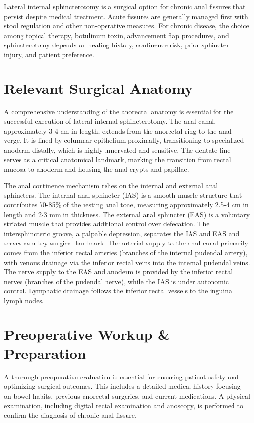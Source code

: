 Lateral internal sphincterotomy is a surgical option for chronic anal fissures that persist despite medical treatment. Acute fissures are generally managed first with stool regulation and other non-operative measures. For chronic disease, the choice among topical therapy, botulinum toxin, advancement flap procedures, and sphincterotomy depends on healing history, continence risk, prior sphincter injury, and patient preference.

\section*{Relevant Surgical Anatomy}
A comprehensive understanding of the anorectal anatomy is essential for the successful execution of lateral internal sphincterotomy. The anal canal, approximately 3-4 cm in length, extends from the anorectal ring to the anal verge. It is lined by columnar epithelium proximally, transitioning to specialized anoderm distally, which is highly innervated and sensitive. The dentate line serves as a critical anatomical landmark, marking the transition from rectal mucosa to anoderm and housing the anal crypts and papillae.

The anal continence mechanism relies on the internal and external anal sphincters. The internal anal sphincter (IAS) is a smooth muscle structure that contributes 70-85\% of the resting anal tone, measuring approximately 2.5-4 cm in length and 2-3 mm in thickness. The external anal sphincter (EAS) is a voluntary striated muscle that provides additional control over defecation. The intersphincteric groove, a palpable depression, separates the IAS and EAS and serves as a key surgical landmark. The arterial supply to the anal canal primarily comes from the inferior rectal arteries (branches of the internal pudendal artery), with venous drainage via the inferior rectal veins into the internal pudendal veins. The nerve supply to the EAS and anoderm is provided by the inferior rectal nerves (branches of the pudendal nerve), while the IAS is under autonomic control. Lymphatic drainage follows the inferior rectal vessels to the inguinal lymph nodes.

\section*{Preoperative Workup \& Preparation}
A thorough preoperative evaluation is essential for ensuring patient safety and optimizing surgical outcomes. This includes a detailed medical history focusing on bowel habits, previous anorectal surgeries, and current medications. A physical examination, including digital rectal examination and anoscopy, is performed to confirm the diagnosis of chronic anal fissure.

